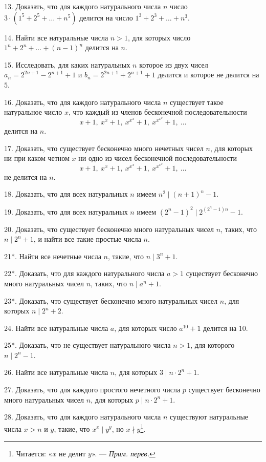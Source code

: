 \documentclass[12pt, a4paper, openany]{book}
\begin{document}
13. Доказать, что для каждого натурального числа $n$ число $3\cdot(1^5+2^5+\ldots+n^5)$ делится на число $1^3+2^3+\ldots+n^3$.

14. Найти все натуральные числа $n>1$, для которых число $1^n+2^n+\ldots+(n-1)^n$ делится на $n$.

15. Исследовать, для каких натуральных $n$ которое из двух чисел $\displaystyle a_n=2^{2n+1}-2^{n+1}+1$ и $b_n=2^{2n+1}+2^{n+1}+1$  делится и которое не делится на $5$.

16. Доказать, что для каждого натурального числа $n$ существует такое натуральное число $x$, что каждый из членов бесконечной последовательности 
$$
\displaystyle x+1,\     x^{x}+1,\     x^{x^{x}}+1,\      x^{x^{x^{x}}}+1,\    \ldots
$$
делится на $n$.

17. Доказать, что существует бесконечно много нечетных чисел $n$, для которых ни при каком четном $x$ ни одно из чисел бесконечной последовательности 
$$
x+1,\     x^{x}+1,\     x^{x^{x}}+1,\      x^{x^{x^{x}}}+1,\    \ldots
$$
не делится на $n$.

18. Доказать, что для всех натуральных $n$ имеем $n^2 \mid (n+1)^n -1 $.

19. Доказать, что для всех натуральных $n$ имеем $(2^n-1)^2 \mid 2^{(2^n-1)n}-1$.

20. Доказать, что существует бесконечно много натуральных чисел $n$, таких, что $n \mid 2^n+1$, и найти все такие простые числа $n$.

21*. Найти все нечетные числа $n$, такие, что $n \mid 3^n+1$.

22*. Доказать, что для каждого натурального числа $a>1$ существует бесконечно много натуральных чисел $n$, таких, что $n \mid a^n+1$.

23*. Доказать, что существует бесконечно много натуральных чисел $n$, для которых $n \mid 2^n+2$.

24. Найти все натуральные числа $a$, для которых число $a^{10}+1$ делится на $10$.

25*. Доказать, что не существует натурального числа $n>1$, для которого $n \mid 2^n-1$.

26. Найти все натуральные числа $n$, для которых $3 \mid n\cdot2^n+1$.

27. Доказать, что для каждого простого нечетного числа $p$ существует бесконечно много натуральных чисел $n$, для которых $p \mid n\cdot2^n+1$.

28. Доказать, что для каждого натурального числа $n$ существуют натуральные числа $x>n$ и $y$, такие, что $x^x \mid y^y$, но $x \nmid y${\footnote{Читается: «$x$ не делит $y$». — \textit{Прим. перев.}}}.
\end{document}
